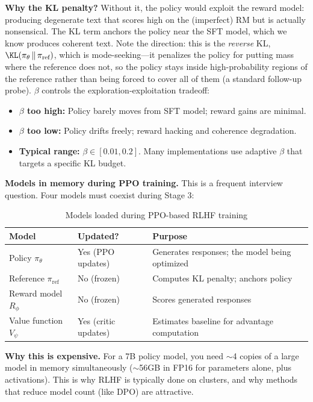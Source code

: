\textbf{Why the KL penalty?} Without it, the policy would exploit the reward model: producing degenerate text that scores high on the (imperfect) RM but is actually nonsensical. The KL term anchors the policy near the SFT model, which we know produces coherent text. Note the direction: this is the \textit{reverse} KL, $\KL(\pi_\theta \,\|\, \pi_{\text{ref}})$, which is mode-seeking---it penalizes the policy for putting mass where the reference does not, so the policy stays inside high-probability regions of the reference rather than being forced to cover all of them (a standard follow-up probe). $\beta$ controls the exploration-exploitation tradeoff:
\begin{itemize}
    \item \textbf{$\beta$ too high:} Policy barely moves from SFT model; reward gains are minimal.
    \item \textbf{$\beta$ too low:} Policy drifts freely; reward hacking and coherence degradation.
    \item \textbf{Typical range:} $\beta \in [0.01, 0.2]$. Many implementations use adaptive $\beta$ that targets a specific KL budget.
\end{itemize}

\textbf{Models in memory during PPO training.} This is a frequent interview question. Four models must coexist during Stage 3:

\begin{table}[H]
\centering
\caption{Models loaded during PPO-based RLHF training}
\begin{tabularx}{\textwidth}{llX}
\toprule
\textbf{Model} & \textbf{Updated?} & \textbf{Purpose} \\
\midrule
Policy $\pi_\theta$ & Yes (PPO updates) & Generates responses; the model being optimized \\
Reference $\pi_{\text{ref}}$ & No (frozen) & Computes KL penalty; anchors policy \\
Reward model $R_\phi$ & No (frozen) & Scores generated responses \\
Value function $V_\psi$ & Yes (critic updates) & Estimates baseline for advantage computation \\
\bottomrule
\end{tabularx}
\end{table}

\textbf{Why this is expensive.} For a 7B policy model, you need $\sim$4 copies of a large model in memory simultaneously ($\sim$56GB in FP16 for parameters alone, plus activations). This is why RLHF is typically done on clusters, and why methods that reduce model count (like DPO) are attractive.

